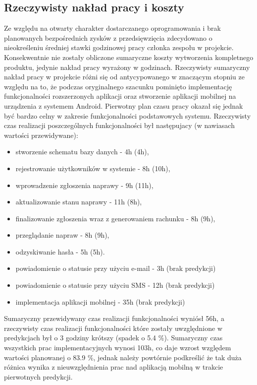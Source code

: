 \documentclass[a4paper,11pt]{article}
\begin{document}
\subsection{Rzeczywisty nakład pracy i koszty}
Ze względu na otwarty charakter dostarczanego oprogramowania i brak planowanych bezpośrednich zysków z przedsięwzięcia zdecydowano o nieokreśleniu średniej stawki godzinowej pracy członka zespołu w projekcie. Konsekwentnie nie zostały obliczone sumaryczne koszty wytworzenia kompletnego produktu, jedynie nakład pracy wyrażony w godzinach.
Rzeczywisty sumaryczny nakład pracy w projekcie różni się od antycypowanego w znaczącym stopniu ze względu na to, że podczas oryginalnego szacunku pominięto implementację funkcjonalności rozszerzonych aplikacji oraz stworzenie aplikacji mobilnej na urządzenia z systemem Android. Pierwotny plan czasu pracy okazał się jednak być bardzo celny w zakresie funkcjonalności podstawowych systemu. Rzeczywisty czas realizacji poszczególnych funkcjonalności był następujacy (w nawiasach wartości przewidywane):
\begin{itemize}
	\item stworzenie schematu bazy danych - 4h (4h), 
	\item rejestrowanie użytkowników w systemie - 8h (10h), 
	\item wprowadzenie zgłoszenia naprawy - 9h (11h),
	\item aktualizowanie stanu naprawy - 11h (8h),
	\item finalizowanie zgłoszenia wraz z generowaniem rachunku - 8h (9h),
	\item przeglądanie napraw - 8h (9h),
	\item odzyskiwanie hasła - 5h (5h).
	\item powiadomienie o statusie przy użyciu e-mail - 3h (brak predykcji)
	\item powiadomienie o statusie przy użyciu SMS - 12h (brak predykcji)
	\item implementacja aplikacji mobilnej - 35h (brak predykcji)
\end{itemize}
Sumaryczny przewidywany czas realizacji funkcjonalności wyniósł 56h, a rzeczywisty czas realizacji funkcjonalności które zostały uwzględnione w predykcjach był o 3 godziny krótszy (spadek o 5.4 \%). Sumaryczny czas wszystkich prac implementacyjnych wynosi 103h, co daje wzrost względem wartości planowanej o 83.9 \%, jednak należy powtórnie podkreślić że tak duża różnica wynika z nieuwzględnienia prac nad aplikacją mobilną w trakcie pierwotnych predykcji.
\end{document}
